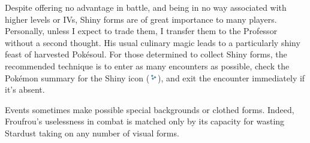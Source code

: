 Despite offering no advantage in battle, and being in no way associated with
  higher levels or IVs, Shiny forms are of great importance to many players.
Personally, unless I expect to trade them, I transfer them to the Professor
  without a second thought.
His usual culinary magic leads to a particularly shiny feast of harvested Pokésoul.
For those determined to collect Shiny forms, the recommended technique
  is to enter as many encounters as possible, check the Pokémon summary
  for the Shiny icon (\includegraphics[width=1em,keepaspectratio]{images/shiny.png}),
  and exit the encounter immediately if it's absent.

Events sometimes make possible special backgrounds or clothed forms.
Indeed, Froufrou's uselessness in combat is matched only by its
  capacity for wasting Stardust taking on any number of visual forms.


